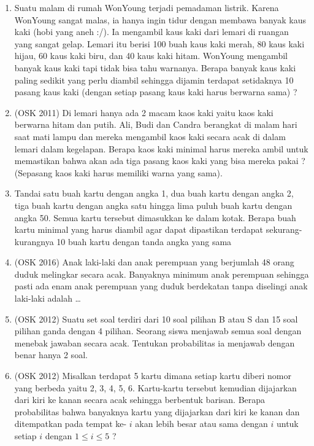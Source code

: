 \documentclass[11pt]{scrartcl}
\begin{document}
\begin{enumerate}
    \item Suatu malam di rumah WonYoung terjadi pemadaman listrik. Karena WonYoung sangat malas, ia hanya ingin tidur dengan membawa banyak kaus kaki (hobi yang aneh :/). Ia mengambil kaus kaki dari lemari di ruangan yang sangat gelap. Lemari itu berisi 100 buah kaus kaki merah, 80 kaus kaki hijau, 60 kaus kaki biru, dan 40 kaus kaki hitam. WonYoung mengambil banyak kaus kaki tapi tidak bisa tahu warnanya. Berapa banyak kaus kaki paling sedikit yang perlu diambil sehingga dijamin terdapat setidaknya 10 pasang kaus kaki (dengan setiap pasang kaus kaki harus berwarna sama) ?
    
    \item (OSK 2011) Di lemari hanya ada 2 macam kaos kaki yaitu kaos kaki berwarna hitam dan putih. 
Ali, Budi dan Candra berangkat di malam hari saat mati lampu dan mereka mengambil kaos kaki 
secara acak di dalam lemari dalam kegelapan. Berapa kaos kaki minimal harus mereka ambil untuk 
memastikan bahwa akan ada tiga pasang kaos kaki yang bisa mereka pakai ? (Sepasang kaos kaki harus 
memiliki warna yang sama).
    
    \item Tandai satu buah kartu dengan angka 1, dua buah kartu dengan angka 2, tiga buah kartu dengan 
angka satu hingga lima puluh buah kartu dengan angka 50. Semua kartu tersebut dimasukkan ke dalam kotak. Berapa buah kartu minimal yang harus diambil agar dapat dipastikan terdapat sekurang-kurangnya 10 buah kartu dengan tanda angka yang sama 

    \item (OSK 2016)
	Anak laki-laki dan anak perempuan yang berjumlah 48 orang duduk melingkar secara acak.
Banyaknya minimum anak perempuan sehingga pasti ada enam anak perempuan yang duduk
berdekatan tanpa diselingi anak laki-laki adalah \dots

    \item (OSK 2012) Suatu set soal terdiri dari 10 soal pilihan B atau S dan 15 soal pilihan ganda dengan 4 pilihan. Seorang siswa menjawab semua soal dengan menebak jawaban secara acak. Tentukan probabilitas ia menjawab dengan benar hanya 2 soal.
            
            \item (OSK 2012) Misalkan terdapat 5 kartu dimana setiap kartu diberi nomor yang berbeda yaitu 2, 3, 4, 5, 6. Kartu-kartu tersebut kemudian dijajarkan dari kiri ke kanan secara acak sehingga berbentuk barisan. Berapa probabilitas bahwa banyaknya kartu yang dijajarkan dari kiri ke kanan dan ditempatkan pada tempat ke- $i$ akan lebih besar atau sama dengan $i$ untuk setiap $i$ dengan $1 \le i \le 5$ ?
            

\end{enumerate}
\end{document}
